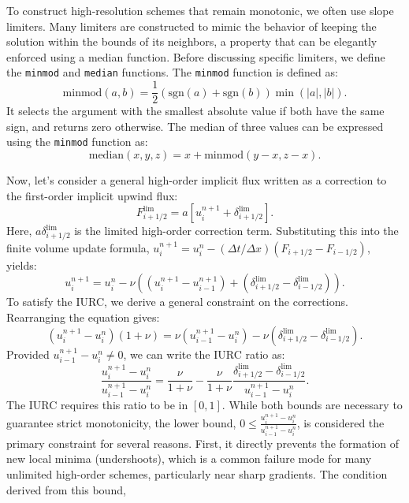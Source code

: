 To construct high-resolution schemes that remain monotonic, we often use slope limiters.
Many limiters are constructed to mimic the behavior of keeping the solution within the bounds of its neighbors, a property that can be elegantly enforced using a median function.
Before discussing specific limiters, we define the \texttt{minmod} and \texttt{median} functions.
The \texttt{minmod} function is defined as:
\[
    \text{minmod}(a, b) = \frac{1}{2}(\text{sgn}(a) + \text{sgn}(b))\min(|a|, |b|).
\]
It selects the argument with the smallest absolute value if both have the same sign, and returns zero otherwise.
The median of three values can be expressed using the \texttt{minmod} function as:
\[
    \text{median}(x, y, z) = x + \text{minmod}(y-x, z-x).
\]

Now, let's consider a general high-order implicit flux written as a correction to the first-order implicit upwind flux:
\[
    F_{i+1/2}^{\text{lim}} = a \left[ u_{i}^{n+1} + \delta_{i+1/2}^{\text{lim}} \right].
\]
Here, \(a \delta_{i+1/2}^{\text{lim}}\) is the limited high-order correction term. Substituting this into the finite volume update formula, \(u_i^{n+1} = u_i^n - (\Delta t/\Delta x)(F_{i+1/2} - F_{i-1/2})\), yields:
\[
    u_i^{n+1} = u_i^n - \nu \left( (u_{i}^{n+1} - u_{i-1}^{n+1}) + (\delta_{i+1/2}^{\text{lim}} - \delta_{i-1/2}^{\text{lim}}) \right).
\]
To satisfy the IURC, we derive a general constraint on the corrections.
Rearranging the equation gives:
\begin{equation*}
    \left( u_{i}^{n+1}-u_{i}^{n} \right) (1+\nu)
    = \nu \left( u_{i-1}^{n+1}-u_{i}^{n} \right) -\nu \left( \delta_{i+1/2}^{\text{lim}} - \delta_{i-1/2}^{\text{lim}} \right).
\end{equation*}
Provided \(u_{i-1}^{n+1}-u_{i}^{n} \neq 0\), we can write the IURC ratio as:
\begin{equation*}
    \frac{u_{i}^{n+1}-u_{i}^{n}}{u_{i-1}^{n+1}-u_{i}^{n}}
    = \frac{\nu}{1+\nu} - \frac{\nu}{1+\nu} \frac{ \delta_{i+1/2}^{\text{lim}} - \delta_{i-1/2}^{\text{lim}} }{u_{i-1}^{n+1}-u_{i}^{n}}.
\end{equation*}
The IURC requires this ratio to be in \([0, 1]\).
While both bounds are necessary to guarantee strict monotonicity, the lower bound, \(0 \le \frac{u_{i}^{n+1}-u_{i}^{n}}{u_{i-1}^{n+1}-u_{i}^{n}}\), is considered the primary constraint for several reasons.
First, it directly prevents the formation of new local minima (undershoots), which is a common failure mode for many unlimited high-order schemes, particularly near sharp gradients.
The condition derived from this bound,
